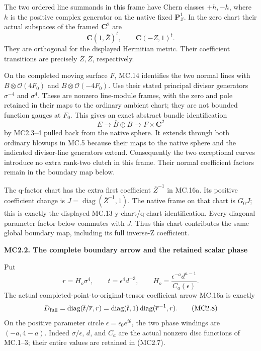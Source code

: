 The two ordered line summands in this frame have Chern classes
\(+h,-h\), where \(h\) is the positive complex generator on the native
fixed \(\mathbf P^1_Z\). In the zero chart their actual subspaces of
the framed \(\mathbf C^2\) are
\[
 \mathbf C(1,\overline Z)^t,\qquad \mathbf C(-Z,1)^t.
                                                               \tag{MC2.5}
\]
They are orthogonal for the displayed Hermitian metric. Their
coefficient transitions are precisely \(\overline Z,Z\), respectively.

On the completed moving surface \(F\), MC.14 identifies the two normal
lines with \(B\otimes\mathcal O(4F_0)\) and
\(B\otimes\mathcal O(-4F_0)\). Use their stated principal divisor
generators \(\sigma^{-4}\) and \(\sigma^4\). These are nonzero line-module
frames, with the zero and pole retained in their maps to the ordinary
ambient chart; they are not bounded function gauges at \(F_0\).
This gives an exact abstract bundle identification
\[
 E\longrightarrow\overline B\oplus B
 \longrightarrow F\times\mathbf C^2                      \tag{MC2.6}
\]
by MC2.3--4 pulled back from the native sphere. It extends through both
ordinary blowups in MC.5 because their maps to the native sphere and
the indicated divisor-line generators extend. Consequently the two
exceptional curves introduce no extra rank-two clutch in this frame.
Their normal coefficient factors remain in the boundary map below.

The q-factor chart has the extra first coefficient
\(\overline Z^{-1}\) in MC.16a. Its positive coefficient change is
\(J=\operatorname{diag}(\overline Z^{-1},1)\). The native frame on
that chart is \(G_0J\); this is exactly the displayed MC.13
y-chart/q-chart identification. Every diagonal parameter factor below
commutes with \(J\). Thus this chart contributes the same global
boundary map, including its full inverse-Z coefficient.

\par

\medskip\noindent\textbf{MC2.2. The complete boundary arrow and the retained scalar phase}

\par\nobreak

Put
\[
 r=H_o\sigma^4,\qquad t=\epsilon^4d^{-3},\qquad
 H_o=\frac{\epsilon^{-a}d^{a-1}}{C_a(\epsilon)}.
                                                               \tag{MC2.7}
\]
The actual completed-point-to-original-tensor coefficient arrow MC.16a
is exactly
\[
 D_{\rm full}
   =\operatorname{diag}(\overline t/\overline r,r)
   =\operatorname{diag}(\overline t,1)
       \operatorname{diag}(\overline r^{-1},r).          \tag{MC2.8}
\]
On the positive parameter circle \(\epsilon=\epsilon_0e^{i\theta}\),
the two phase windings are \((-a,4-a)\). Indeed
\(\sigma/\epsilon\), \(d\), and \(C_a\) are the actual nonzero
disc functions of MC.1--3; their entire values are retained in (MC2.7).

